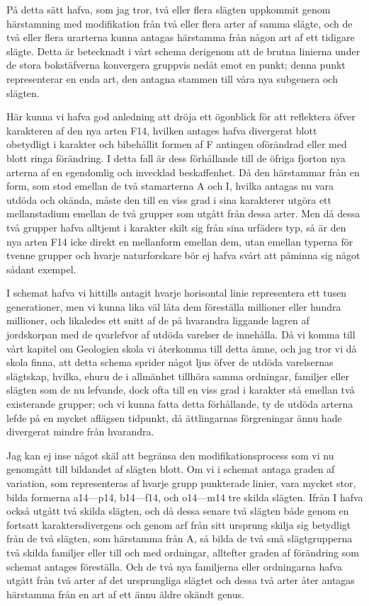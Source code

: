 På detta sätt hafva, som jag tror, två eller flera slägten uppkommit genom härstamning med modifikation från två eller flera arter af samma slägte, och de två eller flera urarterna kunna antagas härstamma från någon art af ett tidigare slägte. Detta är betecknadt i vårt schema derigenom att de brutna linierna under de stora bokstäfverna konvergera gruppvis nedåt emot en punkt; denna punkt representerar en enda art, den antagna stammen till våra nya subgenera och slägten.

Här kunna vi hafva god anledning att dröja ett ögonblick för att reflektera öfver karakteren af den nya arten F14, hvilken antages hafva divergerat blott obetydligt i karakter och bibehållit formen af F antingen oförändrad eller med blott ringa förändring. I detta fall är dess förhållande till de öfriga fjorton nya arterna af en egendomlig och invecklad beskaffenhet. Då den härstammar från en form, som stod emellan de två stamarterna A och I, hvilka antagas nu vara utdöda och okända, måste den till en viss grad i sina karakterer utgöra ett mellanstadium emellan de två grupper som utgått från dessa arter. Men då dessa två grupper hafva alltjemt i karakter skilt sig från sina urfäders typ, så är den nya arten F14 icke direkt en mellanform emellan dem, utan emellan typerna för tvenne grupper och hvarje naturforskare bör ej hafva svårt att påminna sig något sådant exempel.

I schemat hafva vi hittills antagit hvarje horisontal linie representera ett tusen generationer, men vi kunna lika väl låta dem föreställa millioner eller hundra millioner, och likaledes ett snitt af de på hvarandra liggande lagren af jordskorpan med de qvarlefvor af utdöda varelser de innehålla. Då vi komma till vårt kapitel om Geologien skola vi återkomma till detta ämne, och jag tror vi då skola finna, att detta schema sprider något ljus öfver de utdöda varelsernas slägtskap, hvilka, ehuru de i allmänhet tillhöra samma ordningar, familjer eller slägten som de nu lefvande, dock ofta till en viss grad i karakter stå emellan två existerande grupper; och vi kunna fatta detta förhållande, ty de utdöda arterna lefde på en mycket aflägsen tidpunkt, då ättlingarnas förgreningar ännu hade divergerat mindre från hvarandra.

Jag kan ej inse något skäl att begränsa den modifikationsprocess som vi nu genomgått till bildandet af slägten blott. Om vi i schemat antaga graden af variation, som representeras af hvarje grupp punkterade linier, vara mycket stor, bilda formerna a14—p14, b14—f14, och o14—m14 tre skilda slägten. Ifrån I hafva också utgått två skilda slägten, och då dessa senare två slägten både genom en fortsatt karaktersdivergens och genom arf från sitt ursprung skilja sig betydligt från de två slägten, som härstamma från A, så bilda de två små slägtgrupperna två skilda familjer eller till och med ordningar, alltefter graden af förändring som schemat antages föreställa. Och de två nya familjerna eller ordningarna hafva utgått från två arter af det ursprungliga slägtet och dessa två arter åter antagas härstamma från en art af ett ännu äldre okändt genus.


